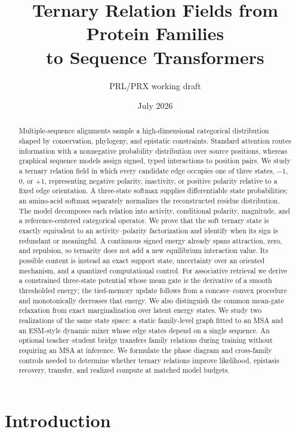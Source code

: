 \documentclass[10pt,twocolumn]{article}
\title{Ternary Relation Fields from Protein Families\\
to Sequence Transformers}
\author{PRL/PRX working draft}
\date{July 2026}
\newcommand{\1}{\mathbf 1}
\theoremstyle{remark}
\begin{document}
\maketitle

\begin{abstract}
Multiple-sequence alignments sample a high-dimensional categorical distribution shaped by
conservation, phylogeny, and epistatic constraints.  Standard attention routes information with a
nonnegative probability distribution over source positions, whereas graphical sequence models
assign signed, typed interactions to position pairs.  We study a ternary relation field in
which every candidate edge occupies one of three states, $-1$, $0$, or $+1$, representing negative
polarity, inactivity, or positive polarity relative to a fixed edge orientation.  A three-state
softmax supplies differentiable state probabilities; an amino-acid softmax separately normalizes
the reconstructed residue distribution.  The model decomposes each relation into activity,
conditional polarity, magnitude, and a reference-centered categorical operator.  We prove that the
soft ternary state is exactly equivalent to an activity--polarity factorization and identify when
its sign is redundant or meaningful.  A continuous signed energy already spans attraction, zero,
and repulsion, so ternarity does not add a new equilibrium interaction value.  Its possible content
is instead an exact support state, uncertainty over an oriented mechanism, and a quantized
computational control.  For associative retrieval we derive a constrained three-state potential
whose mean gate is the derivative of a smooth thresholded energy; the tied-memory update follows
from a concave--convex procedure and monotonically decreases that energy.  We also distinguish the
common mean-gate relaxation from exact
marginalization over latent energy states.  We study two realizations of the same state space: a
static family-level graph fitted to an MSA and an ESM-style dynamic mixer whose edge states depend
on a single sequence.  An optional teacher--student bridge transfers family relations during
training without requiring an MSA at inference.  We formulate the phase diagram and cross-family
controls needed to determine whether ternary relations improve likelihood, epistasis recovery,
transfer, and realized compute at matched model budgets.
\end{abstract}

\section{Introduction}
\end{document}
